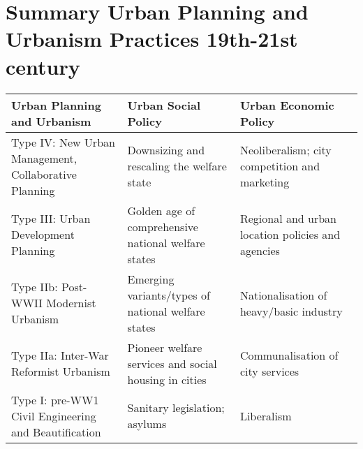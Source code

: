 \documentclass{article}
\begin{document}
\pagebreak
\section{Summary Urban Planning and Urbanism Practices 19th-21st century}

\begin{center}
\begin{tabularx}{\textwidth} { 
  | >{\raggedright\arraybackslash}X 
  | >{\raggedright\arraybackslash}X 
  | >{\raggedright\arraybackslash}X | }
  \hline
  Urban Planning and Urbanism & Urban Social Policy & Urban Economic Policy \\ 
        \hline
  Type IV: New Urban Management, Collaborative Planning
  & Downsizing and rescaling the welfare state
  & Neoliberalism; city competition and marketing \\ 
      \hline
  Type III: Urban Development Planning
  & Golden age of comprehensive national welfare states
  & Regional and urban location policies and agencies \\ 
      \hline
  Type IIb: Post-WWII Modernist Urbanism 
  & Emerging variants/types of national welfare states
  & Nationalisation of heavy/basic industry \\ 
    \hline
  Type IIa: Inter-War Reformist Urbanism 
  & Pioneer welfare services and social housing in cities 
  & Communalisation of city services \\ 
  \hline
  Type I: pre-WW1 Civil Engineering and Beautification 
  & Sanitary legislation; asylums 
  & Liberalism \\ 
  \hline
\end{tabularx}
\end{center}
\end{document}

